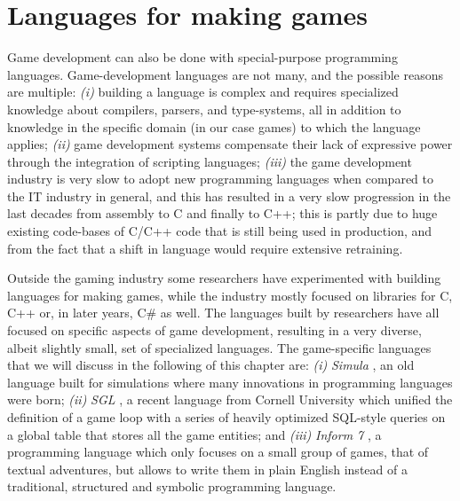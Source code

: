 \section{Languages for making games}

Game development can also be done with special-purpose programming languages. Game-development languages are not many, and the possible reasons are multiple: \textit{(i)} building a language is complex and requires specialized knowledge about compilers, parsers, and type-systems, all in addition to knowledge in the specific domain (in our case games) to which the language applies; \textit{(ii)} game development systems compensate their lack of expressive power through the integration of scripting languages; \textit{(iii)} the game development industry is very slow to adopt new programming languages when compared to the IT industry in general, and this has resulted in a very slow progression in the last decades from assembly to C and finally to C++; this is partly due to huge existing code-bases of C/C++ code that is still being used in production, and from the fact that a shift in language would require extensive retraining.

Outside the gaming industry some researchers have experimented with building languages for making games, while the industry mostly focused on libraries for C, C++ or, in later years, C\# as well. The languages built by researchers have all focused on specific aspects of game development, resulting in a very diverse, albeit slightly small, set of specialized languages. The game-specific languages that we will discuss in the following of this chapter are: \textit{(i)} \textit{Simula} \cite{CHAPTER_2_SIMULA67}, an old language built for simulations where many innovations in programming languages were born; \textit{(ii)} \textit{SGL} \cite{SGL}, a recent language from Cornell University which unified the definition of a game loop with a series of heavily optimized SQL-style queries on a global table that stores all the game entities; and \textit{(iii)} \textit{Inform 7} \cite{CHAPTER_2_INFORM}, a programming language which only focuses on a small group of games, that of textual adventures, but allows to write them in plain English instead of a traditional, structured and symbolic programming language.

